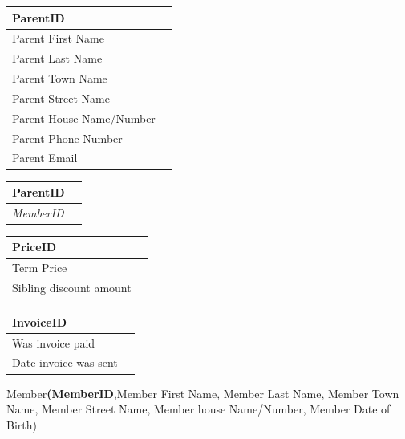 \begin{center}
	\begin{tabular}{|p{4cm}|p{4cm}|}
		\hline
		\textbf{ParentID} \\ \hline
		Parent First Name \\ \hline
		Parent Last Name \\ \hline
		Parent Town Name \\ \hline
		Parent Street Name \\ \hline
		Parent House Name/Number \\ \hline
		Parent Phone Number \\ \hline
		Parent Email \\ \hline	
	\end{tabular}
\end{center}

\begin{center}
	\begin{tabular}{|p{4cm}|p{4cm}|}
		\hline
		\textbf{ParentID} \\ \hline
		\textit{MemberID} \\ \hline		
	\end{tabular}
\end{center}

\begin{center}
	\begin{tabular}{|p{4cm}|p{4cm}|}
		\hline
		\textbf{PriceID} \\ \hline
		Term Price \\ \hline
		Sibling discount amount \\ \hline		
	\end{tabular}
\end{center}

\begin{center}
	\begin{tabular}{|p{4cm}|p{4cm}|}
		\hline
		\textbf{InvoiceID} \\ \hline
		Was invoice paid \\ \hline
		Date invoice was sent \\ \hline		
	\end{tabular}
\end{center}

Member\textbf{(MemberID},Member First Name, Member Last Name, Member Town Name, Member Street Name, Member house Name/Number, Member Date of Birth)

